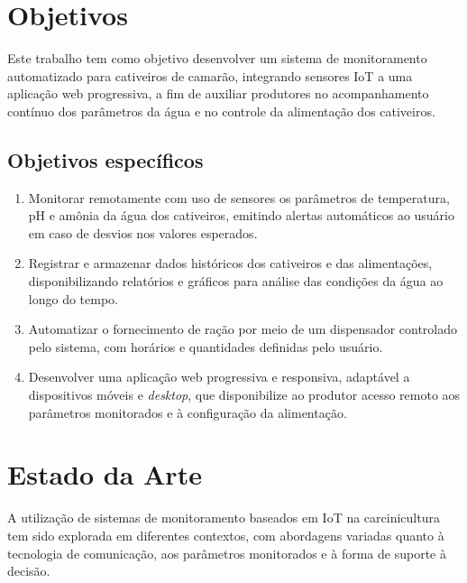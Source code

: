 \documentclass[11pt,a4paper]{article}
\begin{document}
\section{Objetivos}

Este trabalho tem como objetivo desenvolver um sistema de monitoramento automatizado para cativeiros de camarão, integrando sensores IoT a uma aplicação web progressiva, a fim de auxiliar produtores no acompanhamento contínuo dos parâmetros da água e no controle da alimentação dos cativeiros.

\subsection{Objetivos específicos}
 
\begin{enumerate}
    \item Monitorar remotamente com uso de sensores os parâmetros de temperatura, pH e amônia da água dos cativeiros, emitindo alertas automáticos ao usuário em caso de desvios nos valores esperados.
 
    \item Registrar e armazenar dados históricos dos cativeiros e das alimentações, disponibilizando relatórios e gráficos para análise das condições da água ao longo do tempo.
 
    \item Automatizar o fornecimento de ração por meio de um dispensador controlado pelo sistema, com horários e quantidades definidas pelo usuário.
    
    \item Desenvolver uma aplicação web progressiva e responsiva, adaptável a dispositivos móveis e \textit{desktop}, que disponibilize ao produtor acesso remoto aos parâmetros monitorados e à configuração da alimentação.
 
\end{enumerate}

\section{Estado da Arte}
 
A utilização de sistemas de monitoramento baseados em IoT na carcinicultura tem sido explorada em diferentes contextos, com abordagens variadas quanto à tecnologia de comunicação, aos parâmetros monitorados e à forma de suporte à decisão.
 
\end{document}
